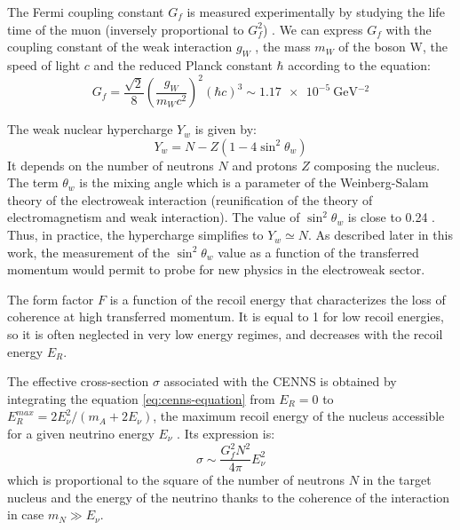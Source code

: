 The Fermi coupling constant $G_f$ is measured experimentally by studying  the life time of the muon (inversely proportional to $G_f^2$) \cite{Chitwood:2007}.
We can express $G_f$ with the coupling constant of the weak interaction $g_W$ , the mass $m_W$ of the boson W, the speed of light $c$ and the reduced Planck constant $\hbar$ according to the equation:
\begin{equation}
G_f 
=
\frac{\sqrt{2}}{8}
\left( \frac{g_W}{m_W c^2} \right)^2
(\hbar c)^3
\sim \SI{1.17e-5}{\giga \eV^{-2}}
\end{equation}

The weak nuclear hypercharge $Y_w$ is given by:
\begin{equation}
Y_w = N - Z (1 - 4 \sin^2 \theta_w)
\end{equation}
It depends on the number of neutrons $N$ and protons $Z$ composing the nucleus. The term  $\theta_w$ is the mixing angle which is a parameter of the Weinberg-Salam theory of the electroweak interaction (reunification of the theory of electromagnetism and weak interaction).
The value of $\sin^2 \theta_w$ is close to 0.24 \cite{Cadeddu:2018izq}. 
Thus, in practice, the hypercharge simplifies to $Y_w \simeq N$. As described later in this work, the measurement of the $\sin^2 \theta_w$ value as a function of the transferred momentum would permit to probe for new physics in the electroweak sector.

The form factor $F$ is a function of the recoil energy that characterizes the loss of coherence at high transferred momentum. It is equal to 1 for low recoil energies, so it is often neglected in very low energy regimes, and decreases with the recoil energy $E_R$.

The effective cross-section $\sigma$ associated with the CENNS is obtained by integrating the equation \ref{eq:cenns-equation} from $E_R = 0$ to $E_R^{max} = 2E_{\nu}^2 / (m_A + 2E_{\nu} )$, the maximum recoil energy of the nucleus accessible for a given neutrino energy $E_{\nu}$ \cite{Scholberg:2015}.
Its expression is:
\begin{equation}
\sigma
\sim
\frac{G_f^2 N^2}{4\pi} E_{\nu}^2
\end{equation}
which is proportional to the square of the number of neutrons $N$ in the target nucleus and the energy of the neutrino thanks to the coherence of the interaction in case $m_N \gg E_{\nu}$.

